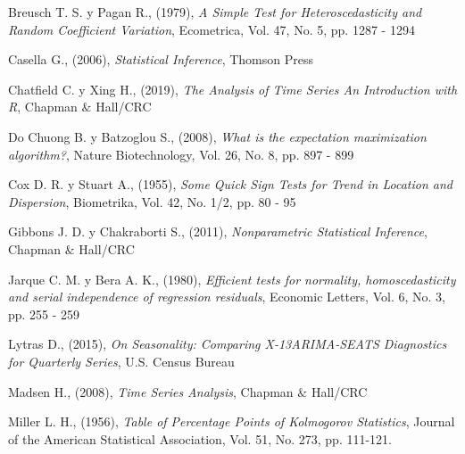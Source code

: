 \begin{thebibliography}{X}

 Breusch T. S. y Pagan R., (1979), \textit{A Simple Test for Heteroscedasticity and Random Coefficient Variation}, Ecometrica, Vol. 47, No. 5, pp. 1287 - 1294

 Casella G., (2006), \textit{Statistical Inference}, Thomson Press \label{Casella}

 Chatfield C. y Xing H., (2019), \textit{The Analysis of Time Series An Introduction with R}, Chapman $\&$ Hall/CRC \label{ChatfieldXing}


 Do Chuong B. y Batzoglou S., (2008), \textit{What is the expectation maximization algorithm?}, Nature Biotechnology, Vol. 26, No. 8, pp. 897 - 899 \label{ChuongBatzoglou}

 Cox D. R. y Stuart A., (1955), \textit{Some Quick Sign Tests for Trend in Location and Dispersion}, Biometrika, Vol. 42, No. 1/2, pp. 80 - 95

 Gibbons J. D. y Chakraborti S., (2011), \textit{Nonparametric Statistical Inference}, Chapman $\&$ Hall/CRC %

 Jarque C. M. y Bera A. K., (1980), \textit{Efficient tests for normality, homoscedasticity and serial independence of regression residuals}, Economic Letters, Vol. 6, No. 3, pp. 255 - 259

 Lytras D., (2015), \textit{On Seasonality: Comparing X-13ARIMA-SEATS Diagnostics for Quarterly Series}, U.S. Census Bureau %

 Madsen H., (2008), \textit{Time Series Analysis}, Chapman $\&$ Hall/CRC

 Miller L. H., (1956), \textit{Table of Percentage Points of Kolmogorov Statistics}, Journal of the American Statistical Association, Vol. 51, No. 273, pp. 111-121. \label{Miller}


\end{thebibliography}
